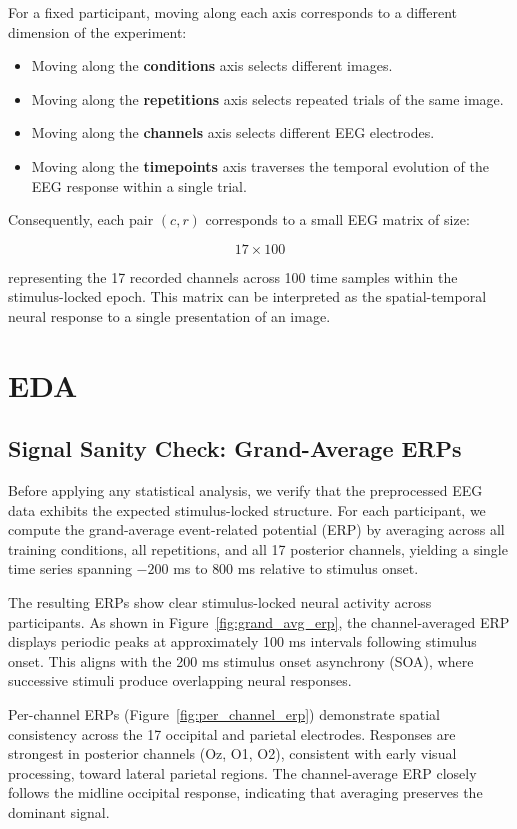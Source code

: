 \documentclass[11pt,letterpaper]{article}
\begin{document}
For a fixed participant, moving along each axis corresponds to a different dimension of the experiment:

\begin{itemize}
\item Moving along the \textbf{conditions} axis selects different images.
\item Moving along the \textbf{repetitions} axis selects repeated trials of the same image.
\item Moving along the \textbf{channels} axis selects different EEG electrodes.
\item Moving along the \textbf{timepoints} axis traverses the temporal evolution of the EEG response within a single trial.
\end{itemize}

Consequently, each pair $(c, r)$ corresponds to a small EEG matrix of size:

\[
17 \times 100
\]

representing the 17 recorded channels across 100 time samples within the stimulus-locked epoch. This matrix can be interpreted as the spatial-temporal neural response to a single presentation of an image.

\section{EDA}

\subsection{Signal Sanity Check: Grand-Average ERPs}

Before applying any statistical analysis, we verify that the preprocessed EEG data exhibits the expected stimulus-locked structure. For each participant, we compute the grand-average event-related potential (ERP) by averaging across all training conditions, all repetitions, and all 17 posterior channels, yielding a single time series spanning $-200$ ms to $800$ ms relative to stimulus onset.

The resulting ERPs show clear stimulus-locked neural activity across participants. As shown in Figure~\ref{fig:grand_avg_erp}, the channel-averaged ERP displays periodic peaks at approximately 100 ms intervals following stimulus onset. This aligns with the 200 ms stimulus onset asynchrony (SOA), where successive stimuli produce overlapping neural responses.

Per-channel ERPs (Figure~\ref{fig:per_channel_erp}) demonstrate spatial consistency across the 17 occipital and parietal electrodes. Responses are strongest in posterior channels (Oz, O1, O2), consistent with early visual processing, toward lateral parietal regions. The channel-average ERP closely follows the midline occipital response, indicating that averaging preserves the dominant signal.
\end{document}
